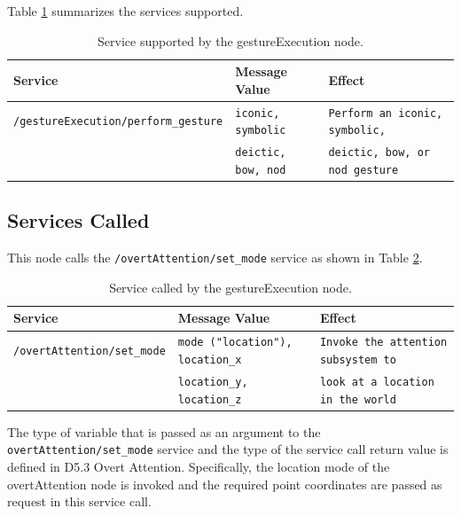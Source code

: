 \documentclass{CSSRforAfrica}
\begin{document}
Table \ref{tab:Supported_services} summarizes the services supported.

\begin{longtable}[c]{|l|l|l|}
    \caption{Service supported by the gestureExecution node.} \label{tab:Supported_services} \\
    \hline
    \rowcolor{gray!30}
    \footnotesize{\textbf{Service}} & \footnotesize{\textbf{Message Value}} & \footnotesize{\textbf{Effect}} \\ \hline
    \endhead %
    
   \footnotesize{\texttt{/gestureExecution/perform\_gesture}} & \footnotesize{\texttt{iconic, symbolic}} &  \footnotesize{\texttt{Perform an iconic, symbolic,}}  \\ 
   \footnotesize{} & \footnotesize{\texttt{deictic, bow, nod}} & \footnotesize{\texttt{deictic, bow, or nod gesture}}  \\\hline
\end{longtable}

\subsection*{Services Called}
This node calls the \texttt{/overtAttention/set\_mode} service as shown in Table \ref{tab:Called_services}.


\begin{longtable}[c]{|l|l|l|}
    \caption{Service called by the gestureExecution node.} \label{tab:Called_services} \\
    \hline
    \rowcolor{gray!30}
    \footnotesize{\textbf{Service}} & \footnotesize{\textbf{Message Value}} & \footnotesize{\textbf{Effect}} \\ \hline
    \endhead %
    
   \footnotesize{\texttt{/overtAttention/set\_mode}} & \footnotesize{\texttt{mode ("location"), location\_x}} &  \footnotesize{\texttt{Invoke the attention subsystem to}}  \\ 
   \footnotesize{} & \footnotesize{\texttt{location\_y, location\_z}} & \footnotesize{\texttt{look at a location in the world}}  \\\hline
\end{longtable}

The type of variable that is passed as an argument to the \texttt{overtAttention/set\_mode} service and the type of the service call return value is defined in D5.3 Overt Attention.  Specifically, the location mode of the overtAttention node is invoked and the required point coordinates are passed as request in this service call.
\end{document}
